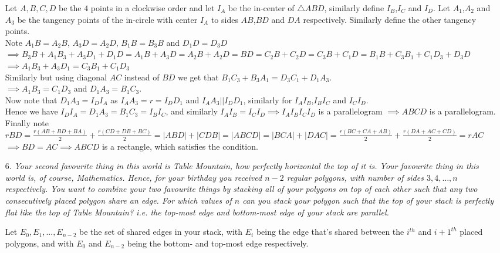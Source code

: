 \documentclass{article}
\begin{document}
\begin{enumerate}
Let $A,B,C,D$ be the $4$ points in a clockwise order and let $I_A$ be the in-center of $\triangle ABD$, similarly define $I_B$,$I_C$ and $I_D$. Let $A_1$,$A_2$ and $A_3$ be the tangency points of the in-circle with center $I_A$ to sides $AB$,$BD$ and $DA$ respectively. Similarly define the other tangency points. 
\\Note $A_1B = A_2B$, $A_3D = A_2D$, $B_1B = B_3B$ and $D_1D = D_3D$
\\$\implies B_3B+A_1B_3+A_3D_1+D_1D = A_1B+A_3D = A_2B+A_2D = BD = C_2B+C_2D = C_3B+C_1D = B_1B+C_3B_1+C_1D_3+D_3D$
\\$\implies A_1B_3 + A_3D_1 = C_3B_1+C_1D_3$
\\Similarly but using diagonal $AC$ instead of $BD$ we get that $B_1C_3 + B_3A_1  = D_3C_1 + D_1A_3$.
\\$\implies A_1B_3 = C_1D_3$ and $D_1A_3 = B_1C_3$. 
\\Now note that $D_1A_3 = I_DI_A$ as $I_AA_3 = r = I_DD_1$ and $I_AA_3||I_DD_1$, similarly for $I_AI_B$,$I_BI_C$ and $I_CI_D$.
\\Hence we have $I_DI_A=D_1A_3=B_1C_3=I_BI_C$, and similarly $I_AI_B=I_CI_D \implies I_AI_BI_CI_D$ is a parallelogram $\implies ABCD$ is a parallelogram. 
\\Finally note $rBD = \frac{r(AB+BD+BA)}{2} + \frac{r(CD+DB+BC)}{2} = |ABD|+|CDB| = |ABCD| = |BCA|+|DAC| = \frac{r(BC+CA+AB)}{2} + \frac{r(DA+AC+CD)}{2} = rAC$
\\$\implies BD=AC \implies ABCD$ is a rectangle, which satisfies the condition.


\medskip
\item[6.] %
{\itshape Your second favourite thing in this world is Table Mountain, how perfectly horizontal the top of it is.
Your favourite thing in this world is, of course, Mathematics.
Hence, for your birthday you received $n-2$ regular polygons, with number of sides $3, 4, \dotsc, n$ respectively.
You want to combine your two favourite things by stacking all of your polygons on top of each other such that any two consecutively placed polygon share an edge.
For which values of $n$ can you stack your polygon such that the top of your stack is perfectly flat like the top of Table Mountain?
i.e. the top-most edge and bottom-most edge of your stack are parallel.}

Let $E_0,E_1,...,E_{n-2}$ be the set of shared edges in your stack, with $E_i$ being the edge that's shared between the $i^{th}$ and $i+1^{th}$ placed polygons, and with $E_0$ and $E_{n-2}$ being the bottom- and top-most edge respectively.


\end{enumerate}
\end{document}
